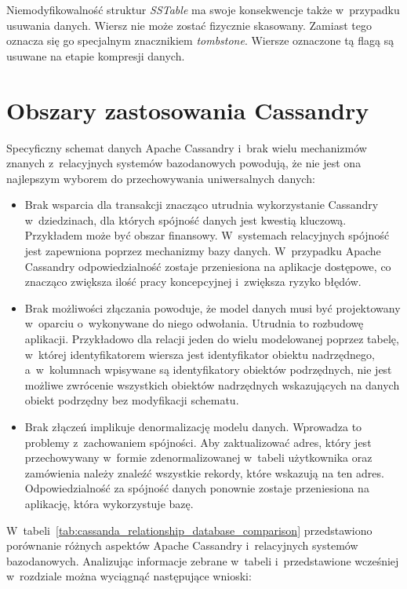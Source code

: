 Niemodyfikowalność struktur \emph{SSTable} ma swoje konsekwencje także w~przypadku usuwania danych. Wiersz nie może zostać fizycznie skasowany. Zamiast tego oznacza się go specjalnym znacznikiem \emph{tombstone}. Wiersze oznaczone tą flagą są usuwane na etapie kompresji danych.

\section{Obszary zastosowania Cassandry}
\label{sec:cassandra_usage_areas}

Specyficzny schemat danych Apache Cassandry i~brak wielu mechanizmów znanych z~relacyjnych systemów bazodanowych powodują, że nie jest ona najlepszym wyborem do przechowywania uniwersalnych danych:

\begin{itemize}
	\item Brak wsparcia dla transakcji znacząco utrudnia wykorzystanie Cassandry w~dziedzinach, dla których spójność danych jest kwestią kluczową. Przykładem może być obszar finansowy. W~systemach relacyjnych spójność jest zapewniona poprzez mechanizmy bazy danych. W~przypadku Apache Cassandry odpowiedzialność zostaje przeniesiona na aplikacje dostępowe, co znacząco zwiększa ilość pracy koncepcyjnej i~zwiększa ryzyko błędów.
	\item Brak możliwości złączania powoduje, że model danych musi być projektowany w~oparciu o~wykonywane do niego odwołania. Utrudnia to rozbudowę aplikacji. Przykładowo dla relacji jeden do wielu modelowanej poprzez tabelę, w~której identyfikatorem wiersza jest identyfikator obiektu nadrzędnego, a~w~kolumnach wpisywane są identyfikatory obiektów podrzędnych, nie jest możliwe zwrócenie wszystkich obiektów nadrzędnych wskazujących na danych obiekt podrzędny bez modyfikacji schematu.
	\item Brak złączeń implikuje denormalizację modelu danych. Wprowadza to problemy z~zachowaniem spójności. Aby zaktualizować adres, który jest przechowywany w~formie zdenormalizowanej w~tabeli użytkownika oraz zamówienia należy znaleźć wszystkie rekordy, które wskazują na ten adres. Odpowiedzialność za spójność danych ponownie zostaje przeniesiona na aplikację, która wykorzystuje bazę.
\end{itemize}

W~tabeli~\ref{tab:cassanda_relationship_database_comparison} przedstawiono porównanie różnych aspektów Apache Cassandry i~relacyjnych systemów bazodanowych. Analizując informacje zebrane w~tabeli i~przedstawione wcześniej w~rozdziale można wyciągnąć następujące wnioski:

